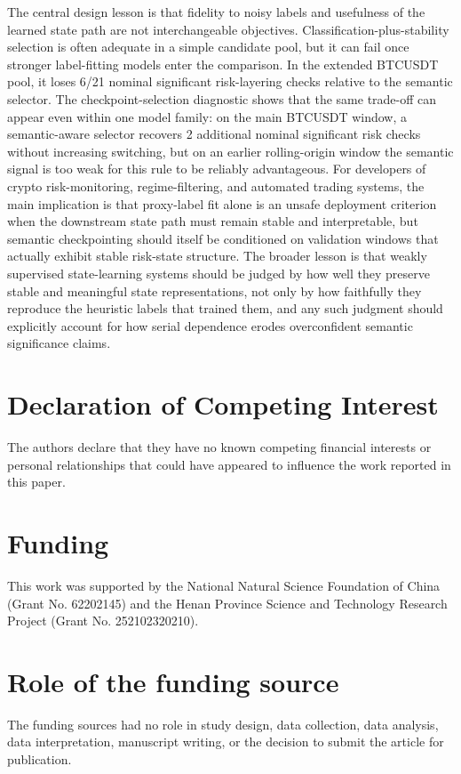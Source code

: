 \documentclass[a4paper,fleqn]{cas-dc}
\begin{document}
The central design lesson is that fidelity to noisy labels and usefulness of the learned state path are not interchangeable objectives. Classification-plus-stability selection is often adequate in a simple candidate pool, but it can fail once stronger label-fitting models enter the comparison. In the extended BTCUSDT pool, it loses 6/21 nominal significant risk-layering checks relative to the semantic selector. The checkpoint-selection diagnostic shows that the same trade-off can appear even within one model family: on the main BTCUSDT window, a semantic-aware selector recovers 2 additional nominal significant risk checks without increasing switching, but on an earlier rolling-origin window the semantic signal is too weak for this rule to be reliably advantageous. For developers of crypto risk-monitoring, regime-filtering, and automated trading systems, the main implication is that proxy-label fit alone is an unsafe deployment criterion when the downstream state path must remain stable and interpretable, but semantic checkpointing should itself be conditioned on validation windows that actually exhibit stable risk-state structure. The broader lesson is that weakly supervised state-learning systems should be judged by how well they preserve stable and meaningful state representations, not only by how faithfully they reproduce the heuristic labels that trained them, and any such judgment should explicitly account for how serial dependence erodes overconfident semantic significance claims.

\clearpage
\printcredits

\section*{Declaration of Competing Interest}
The authors declare that they have no known competing financial interests or personal relationships that could have appeared to influence the work reported in this paper.

\section*{Funding}
This work was supported by the National Natural Science Foundation of China
(Grant No. 62202145) and the Henan Province Science and Technology Research
Project (Grant No. 252102320210).

\section*{Role of the funding source}
The funding sources had no role in study design, data collection, data
analysis, data interpretation, manuscript writing, or the decision to submit
the article for publication.
\end{document}
